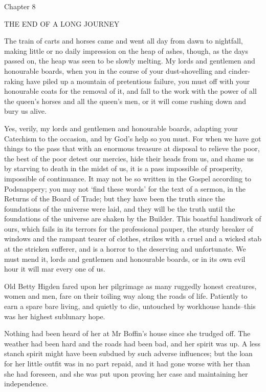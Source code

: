 Chapter 8

THE END OF A LONG JOURNEY


The train of carts and horses came and went all day from dawn to
nightfall, making little or no daily impression on the heap of ashes,
though, as the days passed on, the heap was seen to be slowly melting.
My lords and gentlemen and honourable boards, when you in the course
of your dust-shovelling and cinder-raking have piled up a mountain of
pretentious failure, you must off with your honourable coats for the
removal of it, and fall to the work with the power of all the queen’s
horses and all the queen’s men, or it will come rushing down and bury us
alive.

Yes, verily, my lords and gentlemen and honourable boards, adapting your
Catechism to the occasion, and by God’s help so you must. For when we
have got things to the pass that with an enormous treasure at disposal
to relieve the poor, the best of the poor detest our mercies, hide their
heads from us, and shame us by starving to death in the midst of us, it
is a pass impossible of prosperity, impossible of continuance. It may
not be so written in the Gospel according to Podsnappery; you may not
‘find these words’ for the text of a sermon, in the Returns of the Board
of Trade; but they have been the truth since the foundations of the
universe were laid, and they will be the truth until the foundations of
the universe are shaken by the Builder. This boastful handiwork of
ours, which fails in its terrors for the professional pauper, the sturdy
breaker of windows and the rampant tearer of clothes, strikes with a
cruel and a wicked stab at the stricken sufferer, and is a horror to
the deserving and unfortunate. We must mend it, lords and gentlemen and
honourable boards, or in its own evil hour it will mar every one of us.

Old Betty Higden fared upon her pilgrimage as many ruggedly honest
creatures, women and men, fare on their toiling way along the roads
of life. Patiently to earn a spare bare living, and quietly to die,
untouched by workhouse hands--this was her highest sublunary hope.

Nothing had been heard of her at Mr Boffin’s house since she trudged
off. The weather had been hard and the roads had been bad, and her
spirit was up. A less stanch spirit might have been subdued by such
adverse influences; but the loan for her little outfit was in no part
repaid, and it had gone worse with her than she had foreseen, and she
was put upon proving her case and maintaining her independence.

